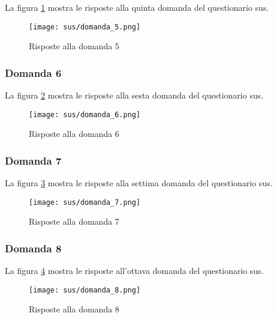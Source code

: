 \vspace{5pt}
\begin{minipage}{\textwidth}
  \par\noindent La figura \ref{fig:sus_q5} mostra le risposte alla quinta domanda del questionario \gls{sus}.
  \begin{figure}[H]
    \centering
    \texttt{[image: sus/domanda\_5.png]}
    \caption{Risposte alla domanda 5}
    \label{fig:sus_q5}
  \end{figure}
\end{minipage}

\subsubsection*{Domanda 6}

\vspace{5pt}
\begin{minipage}{\textwidth}
  \par\noindent La figura \ref{fig:sus_q6} mostra le risposte alla sesta domanda del questionario \gls{sus}.
  \begin{figure}[H]
    \centering
    \texttt{[image: sus/domanda\_6.png]}
    \caption{Risposte alla domanda 6}
    \label{fig:sus_q6}
  \end{figure}
\end{minipage}

\subsubsection*{Domanda 7}

\vspace{5pt}
\begin{minipage}{\textwidth}
  \par\noindent La figura \ref{fig:sus_q7} mostra le risposte alla settima domanda del questionario \gls{sus}.
  \begin{figure}[H]
    \centering
    \texttt{[image: sus/domanda\_7.png]}
    \caption{Risposte alla domanda 7}
    \label{fig:sus_q7}
  \end{figure}
\end{minipage}

\subsubsection*{Domanda 8}

\vspace{5pt}
\begin{minipage}{\textwidth}
  \par\noindent La figura \ref{fig:sus_q8} mostra le risposte all'ottava domanda del questionario \gls{sus}.
  \begin{figure}[H]
    \centering
    \texttt{[image: sus/domanda\_8.png]}
    \caption{Risposte alla domanda 8}
    \label{fig:sus_q8}
  \end{figure}
\end{minipage}

